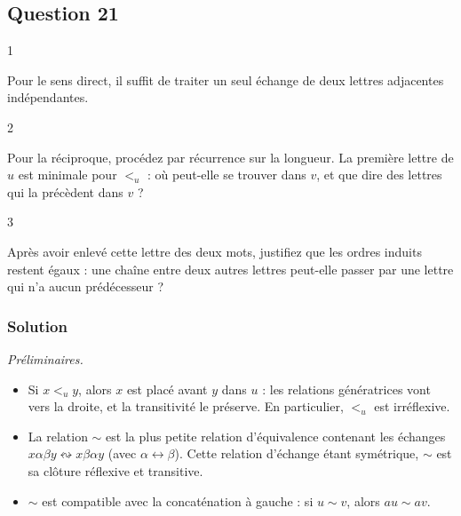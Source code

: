 \documentclass[11pt,a4paper]{article}
\providecommand{\tightlist}{\setlength{\itemsep}{0pt}\setlength{\parskip}{0pt}}
\begin{document}
\hypertarget{question-21}{%
\subsection{Question 21}\label{question-21}}

\begin{indication}{1}

Pour le sens direct, il suffit de traiter un seul échange de deux lettres adjacentes indépendantes.

\end{indication}

\begin{indication}{2}

Pour la réciproque, procédez par récurrence sur la longueur. La première lettre de \(u\) est minimale pour \(<_u\) : où peut-elle se trouver dans \(v\), et que dire des lettres qui la précèdent dans \(v\) ?

\end{indication}

\begin{indication}{3}

Après avoir enlevé cette lettre des deux mots, justifiez que les ordres induits restent égaux : une chaîne entre deux autres lettres peut-elle passer par une lettre qui n'a aucun prédécesseur ?

\end{indication}

\hypertarget{solution-20}{%
\subsubsection{Solution}\label{solution-20}}

\emph{Préliminaires.}

\begin{itemize}
\tightlist
\item
  Si \(x<_uy\), alors \(x\) est placé avant \(y\) dans \(u\) : les relations génératrices vont vers la droite, et la transitivité le préserve. En particulier, \(<_u\) est irréflexive.
\item
  La relation \(\sim\) est la plus petite relation d'équivalence contenant les échanges \(x\alpha\beta y\leftrightsquigarrow x\beta\alpha y\) (avec \(\alpha\leftrightarrow\beta\)). Cette relation d'échange étant symétrique, \(\sim\) est sa clôture réflexive et transitive.
\item
  \(\sim\) est compatible avec la concaténation à gauche : si \(u\sim v\), alors \(au\sim av\).
\end{itemize}
\end{document}
